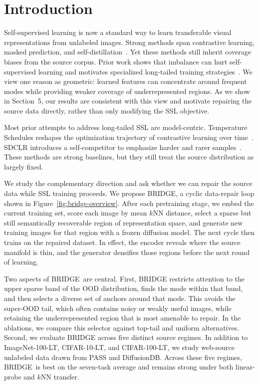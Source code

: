 \documentclass{article}
\newcommand{\method}{BRIDGE}
\begin{document}
\section{Introduction}
Self-supervised learning is now a standard way to learn transferable visual representations from unlabeled images. Strong methods span contrastive learning, masked prediction, and self-distillation~\citep{chen2020simple,he2020momentum,he2022masked,DINO,oquab2023dinov2,dinov3}. Yet these methods still inherit coverage biases from the source corpus. Prior work shows that imbalance can hurt self-supervised learning and motivates specialized long-tailed training strategies~\citep{tian2021divide,assran2210hidden,ts,sdclr}. We view one reason as geometric: learned features can concentrate around frequent modes while providing weaker coverage of underrepresented regions. As we show in Section~5, our results are consistent with this view and motivate repairing the source data directly, rather than only modifying the SSL objective.

Most prior attempts to address long-tailed SSL are model-centric. Temperature Schedules reshapes the optimization trajectory of contrastive learning over time~\citep{ts}. SDCLR introduces a self-competitor to emphasize harder and rarer samples~\citep{sdclr}. These methods are strong baselines, but they still treat the source distribution as largely fixed.

We study the complementary direction and ask whether we can repair the source data while SSL training proceeds. We propose \method, a cyclic data-repair loop shown in Figure~\ref{fig:bridge-overview}. After each pretraining stage, we embed the current training set, score each image by mean $k$NN distance, select a sparse but still semantically recoverable region of representation space, and generate new training images for that region with a frozen diffusion model. The next cycle then trains on the repaired dataset. In effect, the encoder reveals where the source manifold is thin, and the generator densifies those regions before the next round of learning.

Two aspects of \method\ are central. First, BRIDGE restricts attention to the upper sparse band of the OOD distribution, finds the mode within that band, and then selects a diverse set of anchors around that mode. This avoids the super-OOD tail, which often contains noisy or weakly useful images, while retaining the underrepresented region that is most amenable to repair. In the ablations, we compare this selector against top-tail and uniform alternatives. Second, we evaluate BRIDGE across five distinct source regimes. In addition to ImageNet-100-LT, CIFAR-10-LT, and CIFAR-100-LT, we study web-source unlabeled data drawn from PASS and DiffusionDB. Across these five regimes, \method\ is best on the seven-task average and remains strong under both linear-probe and $k$NN transfer.
\end{document}
